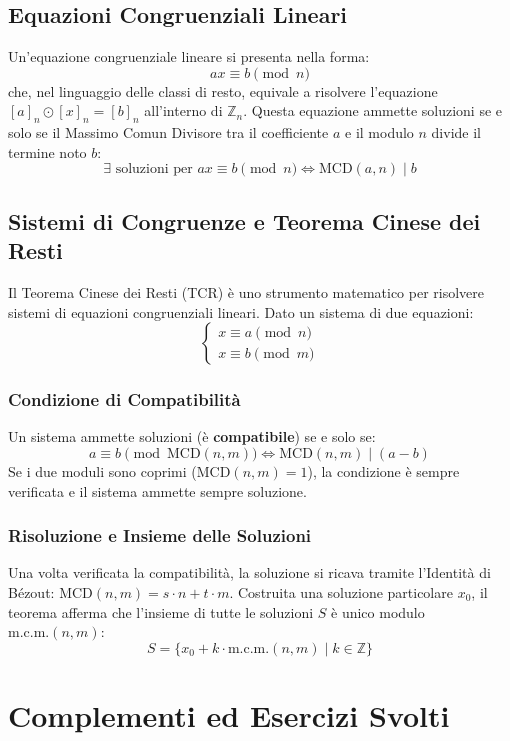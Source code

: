 \documentclass[12pt, a4paper]{article}
\begin{document}
\subsection{Equazioni Congruenziali Lineari}
Un'equazione congruenziale lineare si presenta nella forma:
\[ a x \equiv b \pmod n \]
che, nel linguaggio delle classi di resto, equivale a risolvere l'equazione $[a]_n \odot [x]_n = [b]_n$ all'interno di $\mathbb{Z}_n$.
Questa equazione ammette soluzioni se e solo se il Massimo Comun Divisore tra il coefficiente $a$ e il modulo $n$ divide il termine noto $b$:
\[ \exists \text{ soluzioni per } ax \equiv b \pmod n \iff \text{MCD}(a, n) \mid b \]

\subsection{Sistemi di Congruenze e Teorema Cinese dei Resti}
Il Teorema Cinese dei Resti (TCR) è uno strumento matematico per risolvere sistemi di equazioni congruenziali lineari.
Dato un sistema di due equazioni:
\[
\begin{cases}
    x \equiv a \pmod n \\
    x \equiv b \pmod m
\end{cases}
\]
\subsubsection*{Condizione di Compatibilità}
Un sistema ammette soluzioni (è \textbf{compatibile}) se e solo se:
\[ a \equiv b \pmod{\text{MCD}(n, m)} \iff \text{MCD}(n, m) \mid (a - b) \]
Se i due moduli sono coprimi ($\text{MCD}(n, m) = 1$), la condizione è sempre verificata e il sistema ammette sempre soluzione.

\subsubsection*{Risoluzione e Insieme delle Soluzioni}
Una volta verificata la compatibilità, la soluzione si ricava tramite l'Identità di Bézout: $\text{MCD}(n, m) = s \cdot n + t \cdot m$.
Costruita una soluzione particolare $x_0$, il teorema afferma che l'insieme di tutte le soluzioni $S$ è unico modulo $\text{m.c.m.}(n, m)$:
\[ S = \{ x_0 + k \cdot \text{m.c.m.}(n, m) \mid k \in \mathbb{Z} \} \]


\section{Complementi ed Esercizi Svolti}
\end{document}
